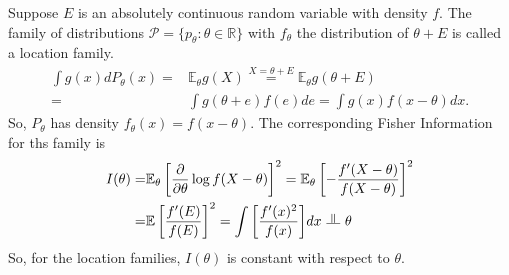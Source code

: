 \begin{example}
    Suppose $E$ is an absolutely continuous random variable with density $f$.
    The family of distributions $\mathcal{P} = \{p_\theta:\theta\in\mathbb{R}\}$ 
    with $f_\theta$ the distribution of $\theta+E$ is called a location family.
    \begin{align}
        \int{g(x)}dP_\theta(x)
        =& \mathbb{E}_\theta{g(X)} \overset{X=\theta+E}{=} \mathbb{E}_\theta{g(\theta+E)}\\
        =& \int{g(\theta+e)f(e)}de = \int{g(x)f(x-\theta)}dx.
    \end{align}
    So, $P_\theta$ has density $f_\theta(x)=f(x-\theta)$. 
    The corresponding Fisher Information for ths family is
    \begin{align}
        I(\theta)
        =& \mathbb{E}_\theta\left[ \frac{\partial}{\partial{\theta}}\log{f(X-\theta)} \right]^2
        = \mathbb{E}_\theta\left[ -\frac{f'(X-\theta)}{f(X-\theta)} \right]^2 \\
        =& \mathbb{E}\left[ \frac{f'(E)}{f(E)} \right]^2
        = \int{\left[\frac{f'(x)^2}{f(x)}\right]}dx~\text{\rotatebox{90}{$\models$}}~\theta
    \end{align}
    So, for the location families, $I(\theta)$ is constant with respect to $\theta$.
\end{example}

